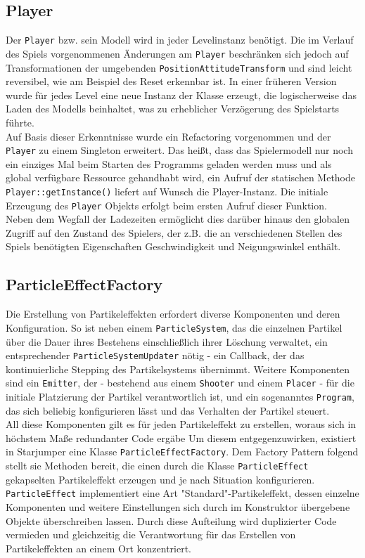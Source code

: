 \documentclass{llncs}
\begin{document}
\subsection{Player}
Der \texttt{Player} bzw. sein Modell wird in jeder Levelinstanz ben\"otigt. Die im Verlauf des Spiels vorgenommenen \"Anderungen
am \texttt{Player} beschr\"anken sich jedoch auf Transformationen der umgebenden \texttt{PositionAttitudeTransform} und sind leicht reversibel,
wie am Beispiel des Reset erkennbar ist. In einer fr\"uheren Version wurde f\"ur jedes Level eine neue Instanz der Klasse
erzeugt, die logischerweise das Laden des Modells beinhaltet, was zu erheblicher Verz\"ogerung des Spielstarts f\"uhrte.\\
Auf Basis dieser Erkenntnisse wurde ein Refactoring vorgenommen und der \texttt{Player} zu einem Singleton erweitert. Das hei\ss t,
dass das Spielermodell nur noch ein einziges Mal beim Starten des Programms geladen werden muss und als global verf\"ugbare
Ressource gehandhabt wird, ein Aufruf der statischen Methode \texttt{Player::getInstance()} liefert auf Wunsch die Player-Instanz.
Die initiale Erzeugung des \texttt{Player} Objekts erfolgt beim ersten Aufruf dieser Funktion.\\
Neben dem Wegfall der Ladezeiten erm\"oglicht dies dar\"uber hinaus den globalen Zugriff auf den Zustand des Spielers,
der z.B. die an verschiedenen Stellen des Spiels ben\"otigten Eigenschaften Geschwindigkeit und Neigungswinkel enth\"alt.

\subsection{ParticleEffectFactory}
Die Erstellung von Partikeleffekten erfordert diverse Komponenten und deren Konfiguration. So ist neben einem \texttt{ParticleSystem}, das
die einzelnen Partikel \"uber die Dauer ihres Bestehens einschlie\ss lich ihrer L\"oschung verwaltet, ein entsprechender
\texttt{ParticleSystemUpdater} n\"otig - ein Callback, der das kontinuierliche Stepping des Partikelsystems \"ubernimmt. Weitere Komponenten
sind ein \texttt{Emitter}, der - bestehend aus einem \texttt{Shooter} und einem \texttt{Placer} - f\"ur die initiale Platzierung der Partikel verantwortlich
ist, und ein sogenanntes \texttt{Program}, das sich beliebig konfigurieren l\"asst und das Verhalten der Partikel steuert.\\
All diese Komponenten gilt es f\"ur jeden Partikeleffekt zu erstellen, woraus sich in h\"ochstem Ma\ss e redundanter Code erg\"abe
Um diesem entgegenzuwirken, existiert in Starjumper eine Klasse \texttt{ParticleEffectFactory}. Dem Factory Pattern folgend stellt sie Methoden
bereit, die einen durch die Klasse \texttt{ParticleEffect} gekapselten Partikeleffekt erzeugen und je nach Situation konfigurieren.\\
\texttt{ParticleEffect} implementiert eine Art "Standard"-Partikeleffekt, dessen einzelne Komponenten und weitere Einstellungen sich
durch im Konstruktor \"ubergebene Objekte \"uberschreiben lassen. Durch diese Aufteilung wird duplizierter Code vermieden und
gleichzeitig die Verantwortung f\"ur das Erstellen von Partikeleffekten an einem Ort konzentriert.
\end{document}
